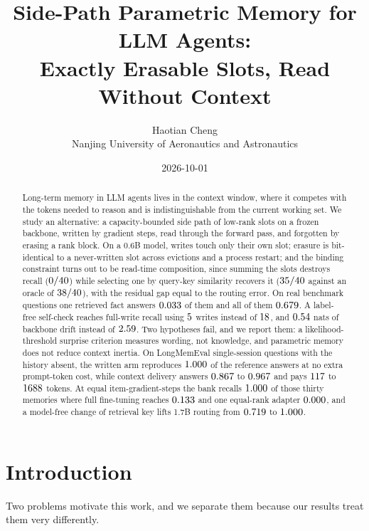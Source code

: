 \documentclass[11pt]{article}
\title{\bf Side-Path Parametric Memory for LLM Agents:\\
Exactly Erasable Slots, Read Without Context}
\author{Haotian Cheng \\ \small Nanjing University of Aeronautics and Astronautics}
\date{2026-10-01}
\begin{document}
\maketitle


\begin{abstract}
Long-term memory in LLM agents lives in the context window, where it competes with the
tokens needed to reason and is indistinguishable from the current working set. We study
an alternative: a capacity-bounded side path of low-rank slots on a frozen backbone,
written by gradient steps, read through the forward pass, and forgotten by erasing a rank
block. On a 0.6B model, writes touch only their own slot; erasure is bit-identical to a
never-written slot across \tErasedTotal{} evictions and a process restart; and the binding
constraint turns out to be read-time composition, since summing the slots destroys recall
($0/40{}$) while selecting one by query-key similarity recovers it ($35/40{}$ against
an oracle of $38/40{}$), with the residual gap equal to the routing error. On real
benchmark questions one retrieved fact answers $0.033{}$ of them and all of them
$0.679{}$. A label-free
self-check reaches full-write recall using $5$ writes instead of
$18$, and $0.54$ nats of backbone drift instead of $2.59$. Two
hypotheses fail, and we report them: a likelihood-threshold surprise criterion measures
wording, not knowledge, and parametric memory does not reduce context inertia. On
\tLongMemSubset{} LongMemEval single-session questions with the history absent, the
written arm reproduces $1.000{}$ of the reference answers at no extra prompt-token
cost, while context delivery answers $0.867{}$ to $0.967{}$ and
pays $117{}$ to $1688{}$ tokens. At equal item-gradient-steps the
bank recalls $1.000{}$ of those thirty memories where full fine-tuning reaches
$0.133{}$ and one equal-rank adapter $0.000{}$, and a model-free change of
retrieval key lifts 1.7B routing from $0.719{}$ to $1.000{}$.
\end{abstract}

\section{Introduction}

Two problems motivate this work, and we separate them because our results treat
them very differently.
\end{document}
